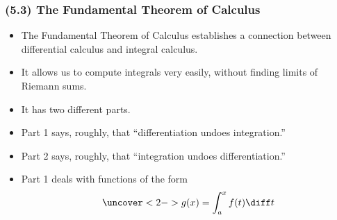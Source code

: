\begin{frame}
\frametitle{(5.3) The Fundamental Theorem of Calculus}
\begin{itemize}
\item  The Fundamental Theorem of Calculus establishes a connection between differential calculus and integral calculus.
\item  It allows us to compute integrals very easily, without finding limits of Riemann sums.
\item  It has two different parts.
\item  Part 1 says, roughly, that ``differentiation undoes integration.''
\item  Part 2 says, roughly, that ``integration undoes differentiation.''
\item<2->  Part 1 deals with functions of the form
\[
\uncover<2->{%
g(x) = \int_a^x  f(t) \diff t%
}%
\]
\end{itemize}
\end{frame}
